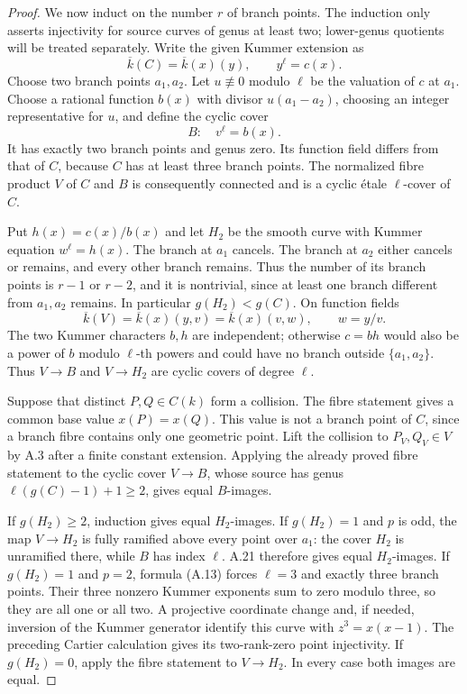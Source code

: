 \begin{proof}
We now induct on the number $r$ of branch points. The
induction only asserts injectivity for source curves of
genus at least two; lower-genus quotients will be treated
separately. Write the given Kummer extension as
\[
 \overline k(C)=\overline k(x)(y),\qquad y^\ell=c(x).
\]
Choose two branch points $a_1,a_2$. Let $u\not\equiv0$
modulo $\ell$ be the valuation of $c$ at $a_1$. Choose a
rational function $b(x)$ with divisor
$u(a_1-a_2)$, choosing an integer representative for $u$,
and define the cyclic cover
\[
 B:\quad v^\ell=b(x).
\]
It has exactly two branch points and genus zero. Its
function field differs from that of $C$, because $C$ has
at least three branch points. The normalized fibre
product $V$ of $C$ and $B$ is consequently connected and
is a cyclic \'etale $\ell$-cover of $C$.

Put $h(x)=c(x)/b(x)$ and let $H_2$ be the smooth curve
with Kummer equation $w^\ell=h(x)$. The branch at $a_1$
cancels. The branch at $a_2$ either cancels or remains,
and every other branch remains. Thus the number of its
branch points is $r-1$ or $r-2$, and it is nontrivial,
since at least one branch different from $a_1,a_2$
remains. In particular $g(H_2)<g(C)$. On function fields
\[
 \overline k(V)=\overline k(x)(y,v)
              =\overline k(x)(v,w),\qquad w=y/v.                \tag{A.14}
\]
The two Kummer characters $b,h$ are independent; otherwise
$c=b h$ would also be a power of $b$ modulo $\ell$-th
powers and could have no branch outside $\{a_1,a_2\}$.
Thus $V\to B$ and $V\to H_2$ are cyclic covers of degree
$\ell$.

Suppose that distinct $P,Q\in C(k)$ form a collision.
The fibre statement gives a common base value
$x(P)=x(Q)$. This value is not a branch point of $C$,
since a branch fibre contains only one geometric point.
Lift the collision to $P_V,Q_V\in V$ by A.3 after a finite
constant extension. Applying the already proved fibre
statement to the cyclic cover $V\to B$, whose source has
genus $\ell(g(C)-1)+1\ge2$, gives equal $B$-images.

If $g(H_2)\ge2$, induction gives equal $H_2$-images. If
$g(H_2)=1$ and $p$ is odd, the map $V\to H_2$ is fully ramified above
every point over $a_1$: the cover $H_2$ is unramified
there, while $B$ has index $\ell$. A.21 therefore gives
equal $H_2$-images. If $g(H_2)=1$ and $p=2$, formula
(A.13) forces $\ell=3$ and exactly three branch points.
Their three nonzero Kummer exponents sum to zero modulo
three, so they are all one or all two. A projective
coordinate change and, if needed, inversion of the
Kummer generator identify this curve with
$z^3=x(x-1)$. The preceding Cartier calculation gives
its two-rank-zero point injectivity. If $g(H_2)=0$, apply the fibre
statement to $V\to H_2$. In every case both images are
equal.


\end{proof}

